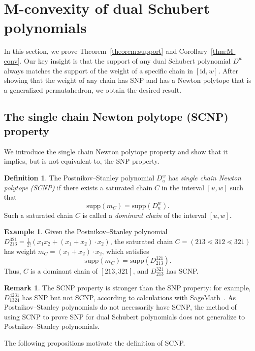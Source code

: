 \documentclass[11pt]{article}
\theoremstyle{definition}
\newtheorem{defi}[theo]{Definition}
\newtheorem{exam}[theo]{Example}
\newtheorem{rema}[theo]{Remark}
\numberwithin{equation}{section}
\newcommand{\id}{\mathrm{id}}
\newcommand{\supp}{\mathrm{supp}}
\begin{document}
\section{M-convexity of dual Schubert polynomials}\label{section:Mconvexity}

In this section, we prove Theorem~\ref{theorem:support} and Corollary~\ref{thm:M-conv}. Our key insight is that the support of any dual Schubert polynomial $D^w$ always matches the support of the weight of a specific chain in $[\id,w]$. After showing that the weight of any chain has SNP and has a Newton polytope that is a generalized permutahedron, we obtain the desired result.

\subsection{The single chain Newton polytope (SCNP) property}\label{section:SCNP} 

We introduce the {single chain Newton polytope} property and show that it implies, but is not equivalent to, the SNP property.

\begin{defi} \label{SCNP}
    The Postnikov--Stanley polynomial $D_{u}^w$ has \emph{single chain Newton polytope (SCNP)} if there exists a saturated chain $C$ in the interval $[u, w]$ such that
    \[\supp(m_C) = \supp(D_u^w).\]
    Such a saturated chain $C$ is called a \emph{dominant chain} of the interval $[u, w]$.
\end{defi}
\begin{exam}
    Given the Postnikov--Stanley polynomial $D_{213}^{321} = \frac{1}{2!}(x_1 x_2 + (x_1 + x_2)\cdot x_2)$, the saturated chain $C = (213 \lessdot 312 \lessdot 321)$ has weight $m_C = (x_1 + x_2)\cdot x_2$, which satisfies 
    \[\supp(m_C) = \supp(D_{213}^{321}).\] 
    Thus, $C$ is a dominant chain of $[213, 321]$, and $D_{213}^{321}$ has SCNP. 
\end{exam}

\begin{rema}\label{example:13244231}
    The SCNP property is stronger than the SNP property: for example, $D_{1324}^{4231}$ has SNP but not SCNP, according to calculations with SageMath~\cite{sagemath}. As Postnikov--Stanley polynomials do not necessarily have SCNP, the method of using SCNP to prove SNP for dual Schubert polynomials does not generalize to Postnikov--Stanley polynomials. 
\end{rema}

The following propositions motivate the definition of SCNP.
\end{document}
